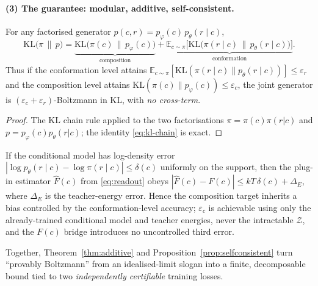 \paragraph{(3) The guarantee: modular, additive, self-consistent.}
\begin{theorem}
\label{thm:additive}
For any factorised generator $p(c,r)=p_\varphi(c)\,p_\theta(r\mid c)$,
\begin{equation}
\mathrm{KL}\!\big(\pi\,\|\,p\big)
=\underbrace{\mathrm{KL}\!\big(\pi(c)\,\|\,p_\varphi(c)\big)}_{\text{composition}}
+\underbrace{\mathbb{E}_{c\sim\pi}\!\big[\mathrm{KL}\!\big(\pi(r\mid c)\,\|\,p_\theta(r\mid c)\big)\big]}_{\text{conformation}} .
\label{eq:kl-chain}
\end{equation}
Thus if the conformation level attains
$\mathbb{E}_{c\sim\pi}[\mathrm{KL}(\pi(r\mid c)\|p_\theta(r\mid c))]\le\varepsilon_r$ and the
composition level attains $\mathrm{KL}(\pi(c)\|p_\varphi(c))\le\varepsilon_c$, the joint
generator is $(\varepsilon_c+\varepsilon_r)$-Boltzmann in KL, with \emph{no cross-term}.
\end{theorem}
\begin{proof}
The KL chain rule applied to the two factorisations $\pi=\pi(c)\pi(r|c)$ and
$p=p_\varphi(c)p_\theta(r|c)$; the identity \eqref{eq:kl-chain} is exact.
\end{proof}
\begin{proposition}
\label{prop:selfconsistent}
If the conditional model has log-density error $|\log p_\theta(r\mid c)-\log\pi(r\mid c)|\le\delta(c)$
uniformly on the support, then the plug-in estimator $\widehat F(c)$ from
\eqref{eq:readout} obeys $|\widehat F(c)-F(c)|\le kT\,\delta(c)+\Delta_E$, where $\Delta_E$
is the teacher-energy error. Hence the composition target inherits a bias controlled by
the conformation-level accuracy; $\varepsilon_c$ is achievable using only the
already-trained conditional model and teacher energies, never the intractable
$\mathcal{Z}$, and the $F(c)$ bridge introduces no uncontrolled third error.
\end{proposition}
Together, Theorem~\ref{thm:additive} and Proposition~\ref{prop:selfconsistent} turn
``provably Boltzmann'' from an idealised-limit slogan into a finite, decomposable bound
tied to two \emph{independently certifiable} training losses.

